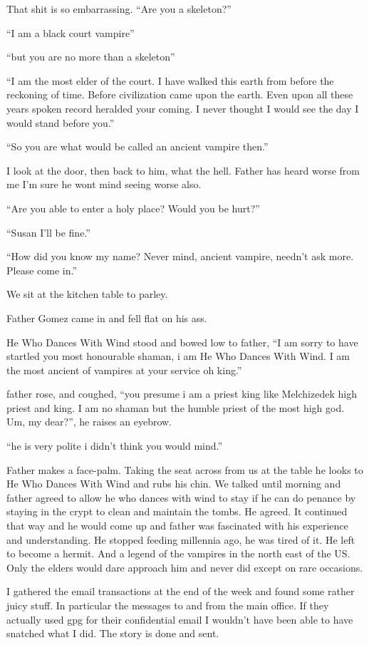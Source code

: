 That shit is so embarrassing. ``Are you a skeleton?''

``I am a black court vampire''

``but you are no more than a skeleton''

``I am the most elder of the court. I have walked this earth from before the reckoning of time. Before civilization came upon the earth. Even upon all these years spoken record heralded your coming. I never thought I would see the day I would stand before you.''

``So you are what would be called an ancient vampire then.''

I look at the door, then back to him, what the hell. Father has heard worse from me I'm sure he wont mind seeing worse also.

``Are you able to enter a holy place? Would you be hurt?''

``Susan I'll be fine.''

``How did you know my name? Never mind, ancient vampire, needn't ask more. Please come in.''

We sit at the kitchen table to parley.

Father Gomez came in and fell flat on his ass.

He Who Dances With Wind stood and bowed low to father, ``I am sorry to have startled you most honourable shaman, i am He Who Dances With Wind. I am the most ancient of vampires at your service oh king.''

father rose, and coughed, ``you presume i am a priest king like Melchizedek high priest and king. I am no shaman but the humble priest of the most high god. Um, my dear?'', he raises an eyebrow.

``he is very polite i didn't think you would mind.''

Father makes a face-palm. Taking the seat across from us at the table he looks to He Who Dances With Wind and rubs his chin.
We talked until morning and father agreed to allow he who dances with wind to stay if he can do penance by staying in the crypt to clean and maintain the tombs. He agreed.
It continued that way and he would come up and father was fascinated with his experience and understanding. He stopped feeding millennia ago, he was tired of it. He left to become a hermit. And a legend of the vampires in the north east of the US. Only the elders would dare approach him and never did except on rare occasions.

I gathered the email transactions at the end of the week and found some rather juicy stuff. In particular the messages to and from the main office. If they actually used gpg for their confidential email I wouldn't have been able to have snatched what I did. The story is done and sent. 

